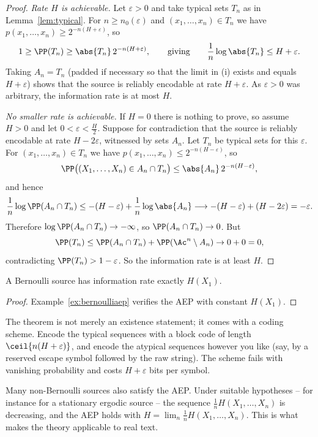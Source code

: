 \begin{proof}
	\emph{Rate $H$ is achievable.} Let $\varepsilon>0$ and take typical sets $T_n$ as in Lemma~\ref{lem:typical}. For $n \ge n_0(\varepsilon)$ and $(x_1,\dots,x_n) \in T_n$ we have $p(x_1,\dots,x_n) \ge 2^{-n(H+\varepsilon)}$, so
	$$1 \ge \PP(T_n) \ge \abs{T_n}\,2^{-n(H+\varepsilon)}, \qquad \text{giving} \qquad \frac1n \log\abs{T_n} \le H+\varepsilon.$$
	Taking $A_n = T_n$ (padded if necessary so that the limit in (i) exists and equals $H + \varepsilon$) shows that the source is reliably encodable at rate $H+\varepsilon$. As $\varepsilon>0$ was arbitrary, the information rate is at most $H$.

	\emph{No smaller rate is achievable.} If $H=0$ there is nothing to prove, so assume $H>0$ and let $0 < \varepsilon < \tfrac{H}{2}$. Suppose for contradiction that the source is reliably encodable at rate $H-2\varepsilon$, witnessed by sets $A_n$. Let $T_n$ be typical sets for this $\varepsilon$. For $(x_1,\dots,x_n)\in T_n$ we have $p(x_1,\dots,x_n) \le 2^{-n(H-\varepsilon)}$, so
	$$\PP\bigl((X_1,\dots,X_n) \in A_n \cap T_n\bigr) \le \abs{A_n}\,2^{-n(H-\varepsilon)},$$
	and hence
	$$\frac1n\log \PP(A_n \cap T_n) \le -(H-\varepsilon) + \frac1n\log\abs{A_n} \longrightarrow -(H-\varepsilon)+(H-2\varepsilon) = -\varepsilon.$$
	Therefore $\log\PP(A_n \cap T_n) \to -\infty$, so $\PP(A_n \cap T_n) \to 0$. But
	$$\PP(T_n) \le \PP(A_n \cap T_n) + \PP(\Ac^n \setminus A_n) \to 0 + 0 = 0,$$
	contradicting $\PP(T_n) > 1-\varepsilon$. So the information rate is at least $H$.
\end{proof}

\begin{corollary}
	A Bernoulli source has information rate exactly $H(X_1)$.
\end{corollary}

\begin{proof}
	Example~\ref{ex:bernoulliaep} verifies the AEP with constant $H(X_1)$.
\end{proof}

\begin{remark}
	The theorem is not merely an existence statement; it comes with a coding scheme. Encode the typical sequences with a block code of length $\ceil{n(H+\varepsilon)}$, and encode the atypical sequences however you like (say, by a reserved escape symbol followed by the raw string). The scheme fails with vanishing probability and costs $H+\varepsilon$ bits per symbol.

	Many non-Bernoulli sources also satisfy the AEP. Under suitable hypotheses -- for instance for a stationary ergodic source -- the sequence $\frac1n H(X_1,\dots,X_n)$ is decreasing, and the AEP holds with $H = \lim_n \frac1n H(X_1,\dots,X_n)$. This is what makes the theory applicable to real text.
\end{remark}

